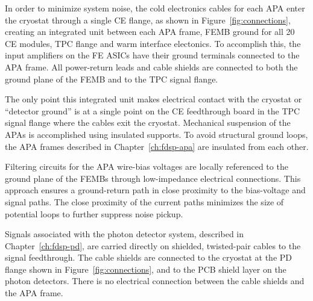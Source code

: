 In order to minimize system noise, the cold electronics cables for each APA enter 
the cryostat through a single CE flange, as shown in Figure~\ref{fig:connections}, creating an integrated 
unit between each APA frame, FEMB ground for all 20 CE modules, TPC flange and warm interface
electonics. To accomplish this,
the input amplifiers on the FE ASICs have their ground terminals connected to the APA frame. 
All power-return leads and cable shields are connected to both the ground plane of the FEMB and to the TPC signal flange.

The only point this integrated unit makes electrical contact with the 
cryostat or ``detector ground'' is at a single point on the CE feedthrough board in the TPC signal flange where the 
cables exit the cryostat. Mechanical suspension of the APAs is accomplished using insulated supports. 
To avoid structural ground loops, the APA frames described in Chapter~\ref{ch:fdsp-apa} are 
insulated from each other.

Filtering circuits for the APA wire-bias voltages are locally referenced to the ground plane of the FEMBs through low-impedance electrical connections. This approach ensures a ground-return path in close proximity to the bias-voltage and signal paths. The close proximity of the current paths minimizes the size of potential loops to further suppress noise pickup.

Signals associated with the photon detector system, described in Chapter~\ref{ch:fdsp-pd}, are carried directly on shielded, 
twisted-pair cables to the signal feedthrough. The cable shields are connected to the cryostat 
at the PD flange shown in Figure~\ref{fig:connections}, and to the PCB shield layer on the photon 
detectors. There is no electrical connection between the cable shields and the APA frame.

